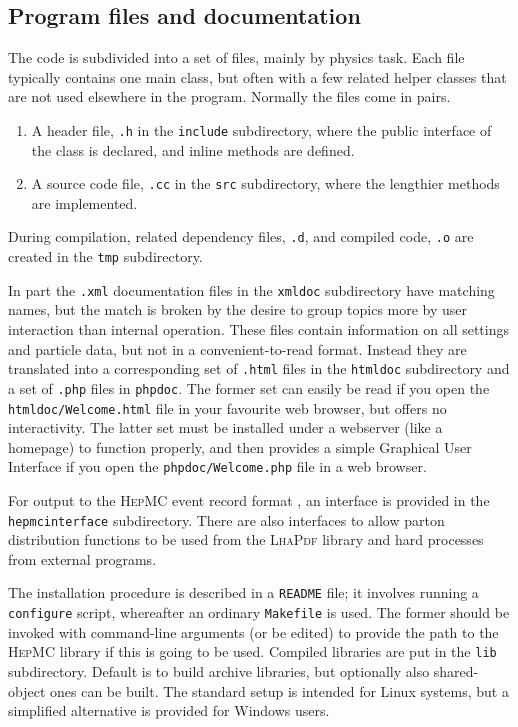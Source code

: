 \documentclass{elsartmod}
\begin{document}
\subsection{Program files and documentation}

The code is subdivided into a set of files, mainly by physics 
task. Each file typically contains one main class, but often
with a few related helper classes that are not used elsewhere in 
the program. Normally the files come in pairs.
\begin{enumerate}
\item A header file, \texttt{.h} in the \texttt{include}
subdirectory, where the public interface of the class is declared, 
and inline methods are defined.
\item A source code file, \texttt{.cc} in the \texttt{src} 
subdirectory, where the lengthier methods are implemented.
\end{enumerate}
During compilation, related dependency files, \texttt{.d}, and 
compiled code, \texttt{.o} are created in the \texttt{tmp}
subdirectory.

In part the \texttt{.xml} documentation files in the \texttt{xmldoc}
subdirectory have matching names, but the match is broken by the
desire to group topics more by user interaction than internal 
operation. These files contain information on all settings and
particle data, but not in a convenient-to-read format. Instead they
are translated into a corresponding set of \texttt{.html} files 
in the \texttt{htmldoc} subdirectory and a set of \texttt{.php} 
files in \texttt{phpdoc}. The former set can easily be read if
you open the \texttt{htmldoc/Welcome.html} file in your favourite
web browser, but offers no interactivity. The latter set must be 
installed under a webserver (like a homepage) to function properly,
and then provides a simple Graphical User Interface if you open the 
\texttt{phpdoc/Welcome.php} file in a web browser.

For output to the \textsc{HepMC} event record format \cite{hepmc}, 
an interface is provided in the \texttt{hepmcinterface} subdirectory.
There are also interfaces to allow parton distribution functions
to be used from the \textsc{LhaPdf} library \cite{lhapdf} and hard 
processes from external programs.

The installation procedure is described in a \texttt{README} file; it
involves running a \texttt{configure} script, whereafter an ordinary
\texttt{Makefile} is used.  The former should be invoked with
command-line arguments (or be edited) to provide the path to the
\textsc{HepMC} library if this is going to be used. Compiled
libraries are put in the \texttt{lib} subdirectory. Default is to
build archive libraries, but optionally also shared-object ones can be
built.  The standard setup is intended for Linux systems, but a
simplified alternative is provided for Windows users. 
\end{document}
